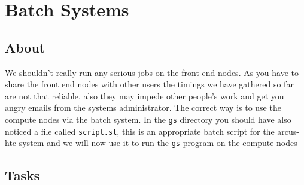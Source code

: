 \documentclass[a4paper, 12pt]{article}
\def \cc   {\tt }               %
\begin{document}

\section{Batch Systems}
\label{heat}

\subsection*{About}
We shouldn't really run any serious jobs on the front end nodes. As you have to share the front end nodes with
other users the timings we have gathered so far are not that reliable, also they may impede other people's work and get you angry emails from the systems administrator.
The correct way is to use the compute nodes via
the batch system. In the {\cc gs} directory you should have also noticed a file called {\cc script.sl}, this is an appropriate
batch script for the arcus-htc system and we will now use it to run the {\cc gs} program on the compute nodes

\subsection*{Tasks}
\end{document}
